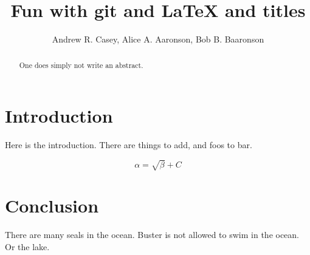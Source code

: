\documentclass{article}
\begin{document}
\title{Fun with git and \LaTeX{ and titles}}
\author{Andrew R. Casey, Alice A. Aaronson, Bob B. Baaronson}

\maketitle

\begin{abstract}
One does simply not write an abstract.
\end{abstract}

\section{Introduction}
Here is the introduction. There are things to add, and foos to bar.

\begin{equation}
    \label{simple_equation}
    \alpha = \sqrt{ \beta } + C
\end{equation}


\section{Conclusion}
There are many seals in the ocean. Buster is not allowed to swim in the ocean. Or the lake.
\end{document}
